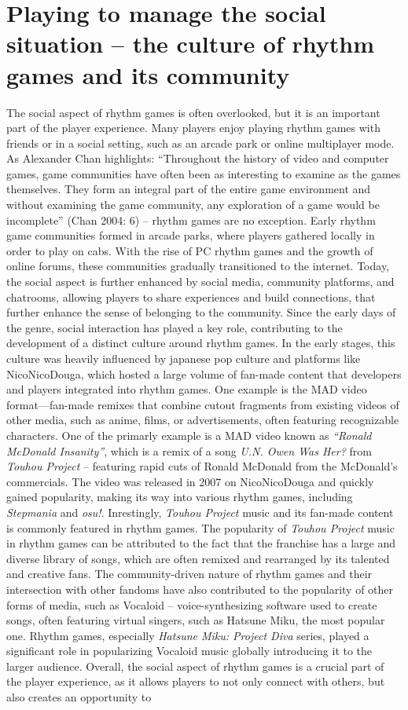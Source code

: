 \section{Playing to manage the social situation -- the culture of rhythm games and its community}
The social aspect of rhythm games is often overlooked, but it is an important part of the player experience. Many players enjoy playing rhythm games with friends or in a social setting, such as an arcade park or online multiplayer mode. As Alexander Chan highlights: “Throughout the history of video and computer games, game communities have often been as interesting to examine as the games themselves. They form an integral part of the entire game environment and without examining the game community, any exploration of a game would be incomplete” (Chan 2004: 6) \cite{arcadeculture} -- rhythm games are no exception. Early rhythm game communities formed in arcade parks, where players gathered locally in order to play on cabs. With the rise of PC rhythm games and the growth of online forums, these communities gradually transitioned to the internet. Today, the social aspect is further enhanced by social media, community platforms, and chatrooms, allowing players to share experiences and build connections, that further enhance the sense of belonging to the community. Since the early days of the genre, social interaction has played a key role, contributing to the development of a distinct culture around rhythm games. In the early stages, this culture was heavily influenced by japanese pop culture and platforms like NicoNicoDouga, which hosted a large volume of fan-made content that developers and players integrated into rhythm games. One example is the MAD video format—fan-made remixes that combine cutout fragments from existing videos of other media, such as anime, films, or advertisements, often featuring recognizable characters. One of the primarly example is a MAD video known as \textit{“Ronald McDonald Insanity”}, which is a remix of a song \textit{U.N. Owen Was Her?} from \textit{Touhou Project} -- featuring rapid cuts of Ronald McDonald from the McDonald’s commercials. The video was released in 2007 on NicoNicoDouga and quickly gained popularity, making its way into various rhythm games, including \textit{Stepmania} and \textit{osu!}. Inrestingly, \textit{Touhou Project} music and its fan-made content is commonly featured in rhythm games. The popularity of \textit{Touhou Project} music in rhythm games can be attributed to the fact that the franchise has a large and diverse library of songs, which are often remixed and rearranged by its talented and creative fans. The community-driven nature of rhythm games and their intersection with other fandoms have also contributed to the popularity of other forms of media, such as Vocaloid -- voice-synthesizing software used to create songs, often featuring virtual singers, such as Hatsune Miku, the most popular one. Rhythm games, especially \textit{Hatsune Miku: Project Diva} series, played a significant role in popularizing Vocaloid music globally introducing it to the larger audience. Overall, the social aspect of rhythm games is a crucial part of the player experience, as it allows players to not only connect with others, but also creates an opportunity to 